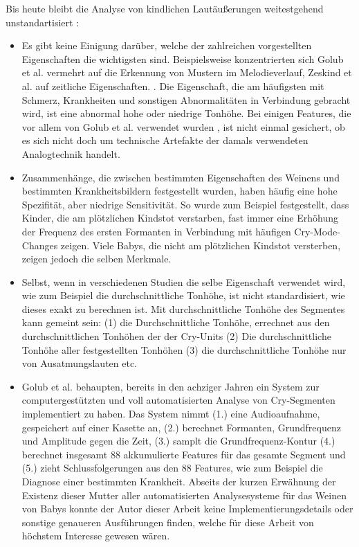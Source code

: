 Bis heute bleibt die Analyse von kindlichen Lautäußerungen weitestgehend unstandartisiert \cite[S. 142]{signal}:
\begin{itemize}
\item Es gibt keine Einigung darüber, welche der zahlreichen vorgestellten Eigenschaften die wichtigsten sind. Beispielsweise konzentrierten sich Golub et al. \cite{cryModel} vermehrt auf die Erkennung von Mustern im Melodieverlauf, Zeskind et al. auf zeitliche Eigenschaften. \cite{rythmic}. Die Eigenschaft, die am häufigsten mit Schmerz, Krankheiten und sonstigen Abnormalitäten in Verbindung gebracht wird, ist eine abnormal hohe oder niedrige Tonhöhe. Bei einigen Features, die vor allem von Golub et al. verwendet wurden \cite{cryModel}, ist nicht einmal gesichert, ob es sich nicht doch um technische Artefakte der damals verwendeten Analogtechnik handelt. \cite[S. 84 - 85]{parentalPerception}
\item Zusammenhänge, die zwischen bestimmten Eigenschaften des Weinens und bestimmten Krankheitsbildern festgestellt wurden, haben häufig eine hohe Spezifität, aber niedrige Sensitivität. So wurde zum Beispiel festgestellt, dass Kinder, die am plötzlichen Kindstot verstarben, fast immer eine Erhöhung der Frequenz des ersten Formanten in Verbindung mit häufigen Cry-Mode-Changes zeigen. Viele Babys, die nicht am plötzlichen Kindstot versterben, zeigen jedoch die selben Merkmale.\cite[S. 85]{parentalPerception}
\item Selbst, wenn in verschiedenen Studien die selbe Eigenschaft verwendet wird, wie zum Beispiel die durchschnittliche Tonhöhe, ist nicht standardisiert, wie dieses exakt zu berechnen ist. Mit \glqq durchschnittliche Tonhöhe des Segmentes\grqq{} kann gemeint sein: (1) die Durchschnittliche Tonhöhe, errechnet aus den durchschnittlichen Tonhöhen der der Cry-Units (2) Die durchschnittliche Tonhöhe aller festgestellten Tonhöhen (3) die durchschnittliche Tonhöhe nur von Ausatmungslauten etc.
\item Golub et al. behaupten, bereits in den achziger Jahren ein System zur computergestützten und voll automatisierten Analyse von Cry-Segmenten implementiert zu haben. Das System nimmt (1.) eine Audioaufnahme, gespeichert auf einer Kasette an, (2.) berechnet Formanten, Grundfrequenz und Amplitude gegen die Zeit, (3.) samplt die Grundfrequenz-Kontur (4.) berechnet insgesamt 88 akkumulierte Features für das gesamte Segment und (5.) zieht Schlussfolgerungen aus den 88 Features, wie zum Beispiel die Diagnose einer bestimmten Krankheit.\cite[S. 75 - 76]{cryModel} Abseits der kurzen Erwähnung der Existenz dieser \grqq Mutter aller automatisierten Analysesysteme für das Weinen von Babys\grqq{} konnte der Autor dieser Arbeit keine Implementierungsdetails oder sonstige genaueren Ausführungen finden, welche für diese Arbeit von höchstem Interesse gewesen wären.
\end{itemize}


